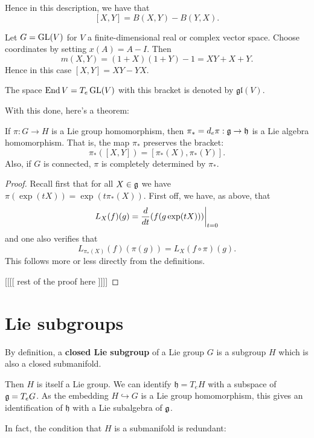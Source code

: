 \documentclass[11pt, english]{article}
\begin{document}
Hence in this description, we have that
$$
[X,Y] = B(X,Y) - B(Y,X).
$$

\begin{example}
Let $G= \operatorname{GL}(V)$ for $V$ a finite-dimensional real or complex vector space. Choose coordinates by setting $x(A) = A-I$. Then
$$
m(X,Y) = (1+X)(1+Y)-1  = XY+ X+Y.
$$
Hence in this case $[X,Y]= XY-YX$. 
\end{example}

The space $\operatorname{End} V=T_e \operatorname{GL}(V)$ with this bracket is denoted by $\mathfrak {gl}(V)$. 

With this done, here's a theorem:

\begin{thm}
If $\pi:G \to H$ is a Lie group homomorphism, then $\pi_\ast= d_e \pi: \mathfrak g \to \mathfrak h$ is a Lie algebra homomorphism. That is, the map $\pi_\ast$ preserves the bracket:
$$
\pi_\ast([X,Y]) = [\pi_\ast(X), \pi_\ast(Y)].
$$
Also, if $G$ is connected, $\pi$ is completely determined by $\pi_\ast$.
\end{thm}
\begin{proof}
Recall first that for all $X \in \mathfrak g$ we have $\pi(\exp(t X)) = \exp(t \pi_\ast (X))$. First off, we have, as above, that
$$
L_X(f)(g) = \restr{ \frac{d}{dt} (f(g \exp(tX)))}{t=0}
$$
and one also verifies that
$$
L_{\pi_\ast(X)} (f) (\pi(g)) = L_X(f \circ \pi)(g).
$$
This follows more or less directly from the definitions. 

[[[[ rest of the proof here ]]]]
\end{proof}



\newpage
\section{Lie subgroups}

By definition, a \textbf{closed Lie subgroup} of a Lie group $G$ is a subgroup $H$ which is also a closed submanifold. 

Then $H$ is itself a Lie group. We can identify $\mathfrak h = T_e H$ with a subspace of $\mathfrak g = T_eG$. As the embedding $H \hookrightarrow G$ is a Lie group homomorphism, this gives an identification of $\mathfrak h$ with a Lie subalgebra of $\mathfrak g$. 

In fact, the condition that $H$ is a submanifold is redundant:
\end{document}

